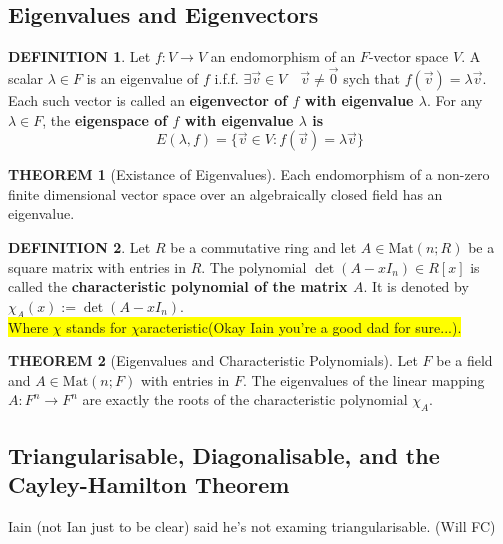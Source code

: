\documentclass[10pt]{article}
\theoremstyle{definition}
\newtheorem{definition}{DEFINITION}[subsection]
\newtheorem{theorem}{THEOREM}[subsection]
\newcommand{\Mat}{\text{Mat}}
\begin{document}
\subsection{Eigenvalues and Eigenvectors}
\begin{definition}
    Let $f:V \rightarrow V$ an endomorphism of an $F$-vector space $V$. A scalar $\lambda \in F$ is an eigenvalue of $f$ i.f.f. $\exists \vec{v} \in V \quad \vec{v} \neq \vec{0}$ sych that $f(\vec{v}) = \lambda\vec{v}$. Each such vector is called an \textbf{eigenvector of $f$ with eigenvalue $\lambda$}. For any $\lambda \in F$, the \textbf{eigenspace of $f$ with eigenvalue $\lambda$ is}    $$E(\lambda,f) = \{\vec{v}\in V:f(\vec{v}) = \lambda\vec{v}\}$$
\end{definition}

\begin{theorem}[Existance of Eigenvalues]
    Each endomorphism of a non-zero finite dimensional vector space over an algebraically closed field has an eigenvalue.
\end{theorem}

\begin{definition}
    Let $R$ be a commutative ring and let $A \in \Mat(n;R)$ be a square matrix with entries in $R$. The polynomial $\det(A-xI_n) \in R[x]$ is called the \textbf{characteristic polynomial of the matrix $A$}. It is denoted by $\chi_A(x):= \det(A-xI_n)$.\\\colorbox{yellow}{Where $\chi$ stands for $\chi$aracteristic\tiny{(Okay Iain you're a good dad for sure...)}.}
\end{definition}

\begin{theorem}[Eigenvalues and Characteristic Polynomials]
    Let $F$ be a field and $A \in \Mat(n;F)$ with entries in $F$. The eigenvalues of the linear mapping $A:F^n \rightarrow F^n$ are exactly the roots of the characteristic polynomial $\chi_A$.
\end{theorem}


\newpage
\subsection{Triangularisable, Diagonalisable, and the Cayley-Hamilton Theorem}
Iain (not Ian just to be clear) said he's not examing triangularisable. (Will FC)
\end{document}
